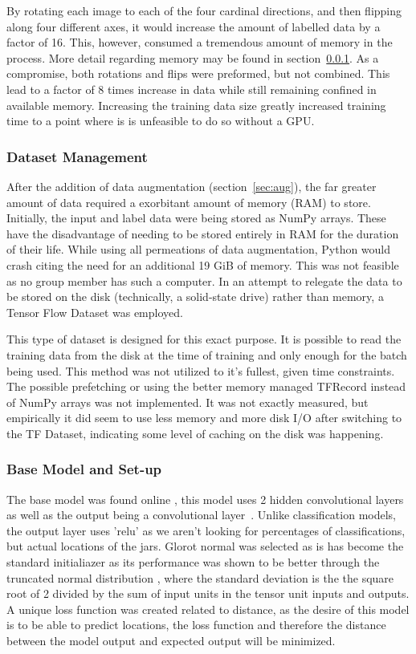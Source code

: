 \documentclass[11pt]{article}
\begin{document}
                By rotating each image to each of the four cardinal directions, and then flipping along four different axes, it would increase the amount of labelled data by a factor of 16. This, however, consumed a tremendous amount of memory in the process. More detail regarding memory may be found in section~\ref{sec:memory}. As a compromise, both rotations and flips were preformed, but not combined. This lead to a factor of 8 times increase in data while still remaining confined in available memory. Increasing the training data size greatly increased training time to a point where is is unfeasible to do so without a GPU.
                
            \subsubsection{Dataset Management}\label{sec:memory}
                After the addition of data augmentation (section~\ref{sec:aug}), the far greater amount of data required a exorbitant amount of memory (RAM) to store. Initially, the input and label data were being stored as NumPy arrays. These have the disadvantage of needing to be stored entirely in RAM for the duration of their life. While using all permeations of data augmentation, Python would crash citing the need for an additional 19 GiB of memory. This was not feasible as no group member has such a computer. In an attempt to relegate the data to be stored on the disk (technically, a solid-state drive) rather than memory, a Tensor Flow Dataset was employed. 

                This type of dataset is designed for this exact purpose. It is possible to read the training data from the disk at the time of training and only enough for the batch being used. This method was not utilized to it's fullest, given time constraints. The possible prefetching or using the better memory managed TFRecord instead of NumPy arrays was not implemented. It was not exactly measured, but empirically it did seem to use less memory and more disk I/O after switching to the TF Dataset, indicating some level of caching on the disk was happening.

            \subsubsection{Base Model and Set-up}
                The base model was found online , this model uses 2 hidden convolutional layers as well as the output being a convolutional layer~\cite{saif}. Unlike classification models, the output layer uses 'relu' as we aren't looking for percentages of classifications, but actual locations of the jars. Glorot normal was selected as is has become the standard initialiazer as its performance was shown to be better through the truncated normal distribution , where the standard deviation is the the square root of 2 divided by the sum of input units in the tensor unit inputs and outputs. A unique loss function was created related to distance, as the desire of this model is to be able to predict locations, the loss function and therefore the distance between the model output and expected output will be minimized.
\end{document}
